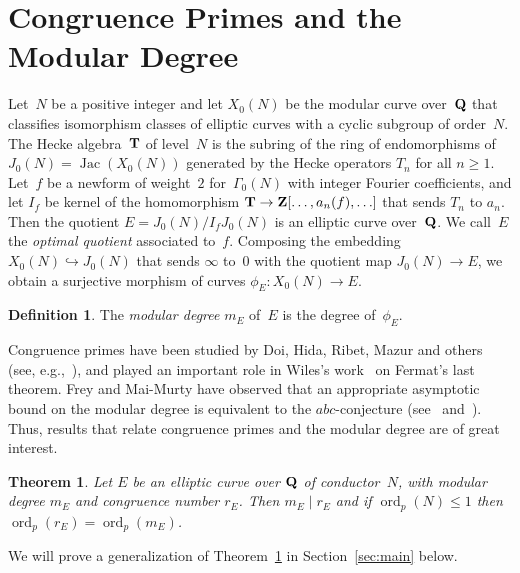 \documentclass[10pt,twoside]{article}
\newcommand{\Z}{{\bf{Z}}}
\newcommand{\Q}{{\bf{Q}}}
\newcommand{\T}{{\bf{T}}}
\newcommand{\ra}{\rightarrow}
\newcommand{\hra}{\hookrightarrow}
\newcommand{\phie}{\phi_{\scriptscriptstyle E}}
\newcommand{\re}{r_{\scriptscriptstyle E}}
\newcommand{\me}{m_{\scriptscriptstyle E}}
\newtheorem{thm}[lem]{Theorem}
\theoremstyle{definition}
\newtheorem{defi}[lem]{Definition}
\DeclareMathOperator{\ord}{ord}
\DeclareMathOperator{\Jac}{Jac}
\begin{document}
\section{Congruence Primes and the Modular Degree} 
\label{sec:elliptic}


Let~$N$ be a positive integer and let $X_0(N)$ be the modular curve
over~$\Q$ that classifies isomorphism classes of elliptic curves with
a cyclic subgroup of order~$N$.  The Hecke algebra~$\T$ of level~$N$
is the subring of the ring of endomorphisms of $J_0(N)=\Jac(X_0(N))$
generated by the Hecke operators $T_n$ for all $n\geq 1$.  Let~$f$ be
a newform of weight~$2$ for~$\Gamma_0(N)$ with integer Fourier
coefficients, and let $I_f$ be kernel of the 
homomorphism $\T\to \Z[\ldots, a_n(f), \ldots]$ that sends $T_n$ to
$a_n$.  Then the quotient $E = J_0(N)/I_f J_0(N)$ is an elliptic curve
over~$\Q$.  We call~$E$ the {\em optimal quotient} associated to~$f$.
Composing the embedding $X_0(N)\hra J_0(N)$ that sends $\infty$ to~$0$
with the quotient map $J_0(N) \ra E$, we obtain a surjective morphism
of curves $\phie: X_0(N) \ra E$.
\begin{defi}
The {\em modular degree} $\me$ of~$E$ is the degree of~$\phie$. 
\end{defi}

\label{congintro}

Congruence primes have been studied by Doi, Hida, Ribet, 
Mazur and others (see, e.g.,~\cite[\S1]{ribet:modp}), 
and played an important role in Wiles's work~\cite{wiles} 
on Fermat's last theorem.  Frey and Mai-Murty have 
observed that an
appropriate asymptotic bound on the modular degree is equivalent to
the $abc$-conjecture (see~\cite[p.544]{frey:ternary} 
and~\cite[p.180]{murty:congruence}). 
Thus, results that relate congruence primes and the modular degree
are of great interest.

\begin{thm}\label{thm:ribet_au}
\label{ddivsr}
Let $E$ be an elliptic curve over $\Q$ of conductor~$N$, with modular
degree $\me$ and congruence number $\re$.  
Then $\me \mid \re$ and if $\ord_p(N)\leq 1$ then $\ord_p(\re) = \ord_p(\me)$. 
\end{thm}
We will prove a generalization of Theorem~\ref{thm:ribet_au}
in Section~\ref{sec:main} below.
\end{document}
